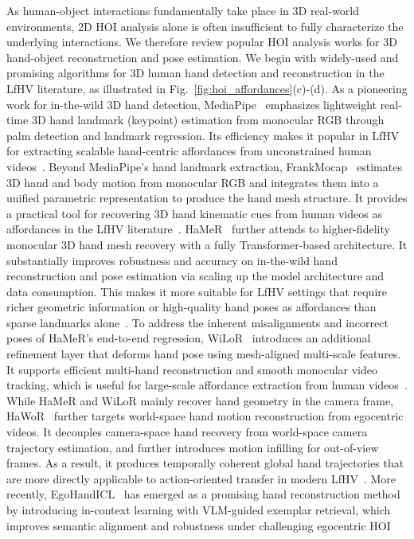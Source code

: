 \documentclass[Afour,sageh,times]{sagej}
\begin{document}
As human-object interactions fundamentally take place in 3D real-world environments, 2D HOI analysis alone is often insufficient to fully characterize the underlying interactions. We therefore review popular HOI analysis works for 3D hand-object reconstruction and pose estimation. We begin with widely-used and promising algorithms for 3D human hand detection and reconstruction in the LfHV literature, as illustrated in Fig.~\ref{fig:hoi_affordances}(c)-(d).
As a pioneering work for in-the-wild 3D hand detection, MediaPipe~\citep{zhang2020mediapipe} emphasizes lightweight real-time 3D hand landmark (keypoint) estimation from monocular RGB through palm detection and landmark regression. Its efficiency makes it popular in LfHV for extracting scalable hand-centric affordances from unconstrained human videos~\citep{arunachalam2022dexterous,qin2022one,gao2023k,gu2023rt,zhou2025human,lu2025visual,haldar2025point}. Beyond MediaPipe's hand landmark extraction, FrankMocap~\citep{rong2020frankmocap} estimates 3D hand and body motion from monocular RGB and integrates them into a unified parametric representation to produce the hand mesh structure. It provides a practical tool for recovering 3D hand kinematic cues from human videos as affordances in the LfHV literature~\citep{patel2022learning,mandikal2022dexvip,sivakumar2022robotic,kannan2023deft,srirama2024hrp,bahety2024screwmimic,chen2024vlmimic,chen2025fmimic}. HaMeR~\citep{pavlakos2024reconstructing} further attends to higher-fidelity monocular 3D hand mesh recovery with a fully Transformer-based architecture. It substantially improves robustness and accuracy on in-the-wild hand reconstruction and pose estimation via scaling up the model architecture and data consumption. This makes it more suitable for LfHV settings that require richer geometric information or high-quality hand poses as affordances than sparse landmarks alone~\citep{li2024okami,shi2025zeromimic,papagiannis2025r,lum2025crossing,liu2025egozero,hsieh2025dexman,luo2025being,guzey2025dexterity,chen2026dexterous}. To address the inherent misalignments and incorrect poses of HaMeR's end-to-end regression, WiLoR~\citep{potamias2025wilor} introduces an additional refinement layer that deforms hand pose using mesh-aligned multi-scale features. It supports efficient multi-hand reconstruction and smooth monocular video tracking, which is useful for large-scale affordance extraction from human videos~\citep{zhou2025you,yuan2025hermes,zhu2025learning,shah2025mimicdroid}. While HaMeR and WiLoR mainly recover hand geometry in the camera frame, HaWoR~\citep{zhang2025hawor} further targets world-space hand motion reconstruction from egocentric videos. It decouples camera-space hand recovery from world-space camera trajectory estimation, and further introduces motion infilling for out-of-view frames. As a result, it produces temporally coherent global hand trajectories that are more directly applicable to action-oriented transfer in modern LfHV~\citep{li2025scalable,luo2026being,luo2026joint,feng2025spatial,yang2026aoe}. More recently, EgoHandICL~\citep{xie2026egohandicl} has emerged as a promising hand reconstruction method by introducing in-context learning with VLM-guided exemplar retrieval, which improves semantic alignment and robustness under challenging egocentric HOI 
\end{document}
